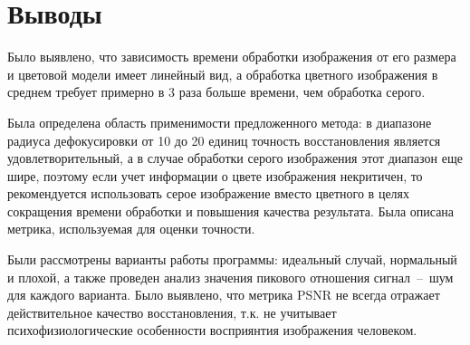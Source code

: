 %
%
%
%
%
%
%

\section*{Выводы}

Было выявлено, что зависимость времени обработки изображения от его размера и цветовой модели имеет линейный вид, а обработка цветного изображения в среднем требует примерно в 3 раза больше времени, чем обработка серого. 

Была определена область применимости предложенного метода: в диапазоне радиуса дефокусировки от 10 до 20 единиц точность восстановления является удовлетворительный, а в случае обработки серого изображения этот диапазон еще шире, поэтому если учет информации о цвете изображения некритичен, то рекомендуется использовать серое изображение вместо цветного в целях сокращения времени обработки и повышения качества результата. Была описана метрика, используемая для оценки точности.

Были рассмотрены варианты работы программы: идеальный случай, нормальный и плохой, а также проведен анализ значения пикового отношения сигнал~--~шум для каждого варианта. Было выявлено, что метрика PSNR не всегда отражает действительное качество восстановления, т.к. не учитывает психофизиологические особенности восприянтия изображения человеком.